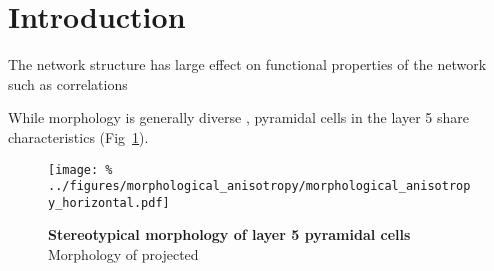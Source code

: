 \clearpage
\pagebreak
\newpage
\section*{Introduction}

The network structure has large effect on functional properties of the network such as correlations \cite{Pernice2011}





While morphology is generally diverse , pyramidal cells in the layer 5 share characteristics (Fig~\ref{fig:stereo_morph}). 


\begin{figure}[h]
  \texttt{[image: \%
    ../figures/morphological\_anisotropy/morphological\_anisotropy\_horizontal.pdf]} %
\caption{\textbf{Stereotypical morphology of layer 5 pyramidal cells} Morphology of projected \cite{Romand2011} }
\label{fig:stereo_morph}
\end{figure}

